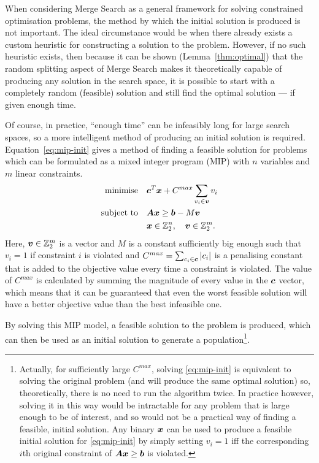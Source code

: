 \documentclass[journal]{IEEEtran}
\begin{document}
When considering Merge Search as a general framework for solving constrained optimisation problems, the method by which the initial solution is produced is not important. The ideal circumstance would be when there already exists a custom heuristic for constructing a solution to the problem. However, if no such heuristic exists, then because it can be shown (Lemma~\ref{thm:optimal}) that the random splitting aspect of Merge Search makes it theoretically capable of producing any solution in the search space, it is possible to start with a completely random (feasible) solution and still find the optimal solution --- if given enough time.

Of course, in practice, ``enough time'' can be infeasibly long for large search spaces, so a more intelligent method of producing an initial solution is required. Equation~\ref{eq:mip-init} gives a method of finding a feasible solution for problems which can be formulated as a mixed integer program (MIP) with $n$ variables and $m$ linear constraints.
%
\begin{align}\label{eq:mip-init}
              \Min \quad &\V{c}^T\V{x} + C^{max} \sum_{v_i \in \V{v}} v_i\\
              \ST  \quad  &\M{A}\V{x} \ge \V{b}-M\V{v}\nonumber\\
                   \quad & \V{x} \in \Bin^n, \quad \V{v} \in \Bin^m.\nonumber
\end{align}
%
Here, $\boldsymbol{v} \in \mathbb{Z}_2^m$ is a vector and $M$ is a constant sufficiently big enough such that $v_i = 1$ if constraint $i$ is violated and $C^{max} = \sum_{c_i \in \boldsymbol{c}} |c_i|$ is a penalising constant that is added to the objective value every time a constraint is violated. The value of $C^{max}$ is calculated by summing the magnitude of every value in the $\boldsymbol{c}$ vector, which means that it can be guaranteed that even the worst feasible solution will have a better objective value than the best infeasible one.

By solving this MIP model, a feasible solution to the problem is produced, which can then be used as an initial solution to generate a population\footnote{Actually, for sufficiently large \(C^{max}\), solving \eqref{eq:mip-init} is equivalent to solving the original problem (and will produce the same optimal solution) so, theoretically, there is no need to run the algorithm twice. In practice however, solving it in this way would be intractable for any problem that is large enough to be of interest, and so would not be a practical way of finding a feasible, initial solution. Any binary \(\boldsymbol{x}\) can be used to produce a feasible initial solution for \eqref{eq:mip-init} by simply setting \(v_i=1\) iff the corresponding \(i\)th original constraint of \(\boldsymbol{A} \boldsymbol{x} \ge \boldsymbol{b}\) is violated.}.
\end{document}
